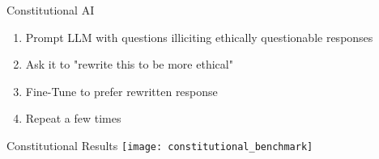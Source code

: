 
\begin{frame}[c]{Constitutional AI}
    \large
    \begin{enumerate}[<+(1)->]
        \item Prompt LLM with questions illiciting ethically questionable responses
        \item Ask it to "rewrite this to be more ethical"
        \item Fine-Tune to prefer rewritten response
        \item Repeat a few times
    \end{enumerate}
\end{frame}

\begin{frame}[c]{Constitutional Results}
    \texttt{[image: constitutional\_benchmark]} \\
\end{frame}

